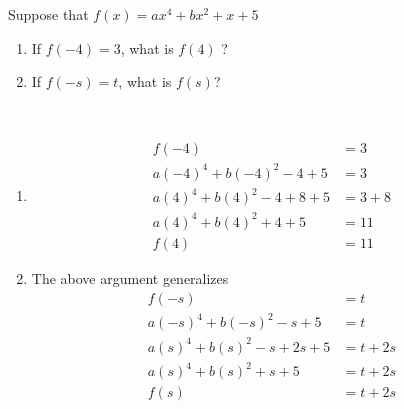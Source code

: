 \begin{exercise}
    Suppose that \( f(x)= a x^{4} + b x^{2}+x + 5 \) 
    \begin{enumerate}[label=\textbf{\roman*)}]
        \item If \( f \left( -4 \right)= 3 \), what is \( f \left( 4 \right) \) ?  
        \item If \( f \left( -s \right) =t \), what is \( f \left( s \right) \)?
    \end{enumerate}
\end{exercise}
\begin{solution}
   $  $ \vspace{-1.5em}
   \begin{enumerate}[label=\textbf{\roman*)}]
    \item  \begin{align*}
        f \left( -4 \right) &= 3 \\
        a \left(  -4 \right)^{4} + b \left( -4 \right)^{2} -4 +5 &= 3 \\
        a \left(  4 \right)^{4} + b \left( 4 \right)^{2} -4 + 8 + 5 &= 3+8 \\
        a \left(  4 \right)^{4} + b \left( 4 \right)^{2} +4 + 5 &= 11 \\
        f \left( 4 \right) &= 11
    \end{align*}
    \item The above argument generalizes 
    \begin{align*}
        f \left( -s \right) &= t  \\
        a \left(  -s \right)^{4} + b \left( -s \right)^{2} -s +5 &= t \\
         a \left(  s \right)^{4} + b \left( s \right)^{2} -s + 2s + 5 &= t+ 2s \\
          a \left(  s \right)^{4} + b \left( s \right)^{2} +s + 5 &= t+ 2s \\
          f \left( s \right) &= t +2s
    \end{align*}
    
   \end{enumerate}
   
    
\end{solution}

